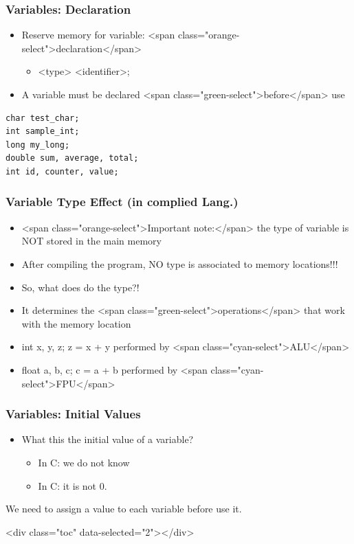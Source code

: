 \documentclass{../c-lecture}
\begin{document}
\begin{frame}[fragile]
  \frametitle{Variables: Declaration}
  \begin{itemize}
    \item
      Reserve memory for variable:
      <span class="orange-select">declaration</span>
    \begin{itemize}
      \item <type> <identifier>;
    \end{itemize}
    \item
      A variable must be declared <span class="green-select">before</span> use
  \end{itemize}
  \begin{verbatim}
char test_char;
int sample_int;
long my_long;
double sum, average, total;
int id, counter, value;
  \end{verbatim}
\end{frame}

\begin{frame}
  \frametitle{Variable Type Effect (in complied Lang.)}
  \begin{itemize}
    \item
      <span class="orange-select">Important note:</span> the type of variable is
      NOT stored in the main memory
    \item
      After compiling the program, NO type is associated to memory locations!!!
  \end{itemize}
  \begin{itemize}
    \item So, what does do the type?!
    \item
      It determines the <span class="green-select">operations</span> that work
      with the memory location
  \end{itemize}
  \begin{itemize}
    \item
      int x, y, z; z = x + y performed by <span class="cyan-select">ALU</span>
    \item
      float a, b, c; c = a + b performed by <span class="cyan-select">FPU</span>
  \end{itemize}
\end{frame}

\begin{frame}
  \frametitle{Variables: Initial Values}
  \begin{itemize}
    \item What this the initial value of a variable?
    \begin{itemize}
      \item In C: we do not know
      \item In C: it is not 0.
    \end{itemize}
  \end{itemize}
  \begin{block}
  We need to assign a value to each variable before use it.
  \end{block}
\end{frame}
\begin{frame}
  <div class="toc" data-selected="2"></div>
\end{frame}
\end{document}
